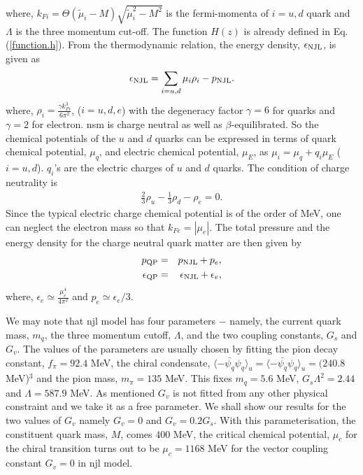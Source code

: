 \documentclass[a4paper, 11pt]{article}
\begin{document}
\noindent where, $k_{Fi}=\Theta(\tilde{\mu}_i-M)\sqrt{\tilde{\mu}_i^2-M^2}$ is the fermi-momenta of $i=u,d$ quark and $\Lambda$ is the three momentum cut-off. The function $H(z)$ is already defined in Eq. (\ref{function.h}). From the thermodynamic relation, the energy density, $\epsilon_{\rm NJL}$, is given as
\begin{equation}
\epsilon_{\rm NJL} = \sum_{i=u,d} \mu_i\rho_i-p_{\rm NJL}. \label{energy.density.njl}
\end{equation}
\noindent where, $\rho_i = \frac{\gamma k_{Fi}^3}{6 \pi^2	}$, ($i=u,d,e$) with the degeneracy factor $\gamma=6$ for quarks and $\gamma=2$ for electron. \ac{nsm} is charge neutral as well as $\beta$-equilibrated. So the chemical potentials of the $u$ and $d$ quarks can be expressed in terms of quark chemical potential, $\mu_q$, and electric chemical potential, $\mu_E$, as $\mu_i = \mu_q + q_i\mu_E$ ($i=u,d$). $q_i$'s are the electric charges of $u$ and $d$ quarks. The condition of charge neutrality is 
\begin{eqnarray}
\frac{2}{3}\rho_u - \frac{1}{3}\rho_d - \rho_e = 0.
\end{eqnarray}
Since the typical electric charge chemical potential is of the order of MeV, one can neglect the electron mass so that $k_{Fe}=|\mu_e|$. The total pressure and the energy density for the charge neutral quark matter are then given by 
\begin{eqnarray}
p_{\rm QP} &=& p_{\rm NJL}+p_e, \label{pressure.qm} 
\\
\epsilon_{\rm QP} &=& \epsilon_{\rm NJL}+\epsilon_e, \label{energy.density.qm}
\end{eqnarray}
\noindent where, $\epsilon_e\simeq \frac{\mu_e^4}{4\pi^2}$ and $p_e \simeq \epsilon_e/3$.

We may note that \ac{njl} model has four parameters $-$ namely, the current quark mass, $m_q$, the three momentum cutoff, $\Lambda$,  and the two coupling constants, $G_s$ and $G_v$. The values of the parameters are usually chosen by fitting the pion decay constant, $f_\pi=92.4$ MeV, the chiral condensate, $\langle-\bar{\psi_q}\psi_q\rangle_u = \langle-\bar{\psi_q}\psi_q\rangle_u = (240.8$ MeV)$^{3}$ and the pion mass, $m_{\pi}=135$ MeV. This fixes $m_q=5.6$ MeV, $G_s\Lambda^2=2.44$ and $\Lambda=587.9$ MeV. As mentioned $G_v$ is not fitted from any other physical constraint and we take it as a free parameter. We shall show our results for the two values of $G_v$ namely $G_v=0$ and $G_v=0.2 G_s$. With this parameterisation, the constituent quark mass, $M$, comes $400$ MeV, the critical chemical potential, $\mu_c$ for the chiral transition turns out to be $\mu_c= 1168$ MeV for the vector coupling constant $G_v=0$ in \ac{njl} model.
\end{document}
